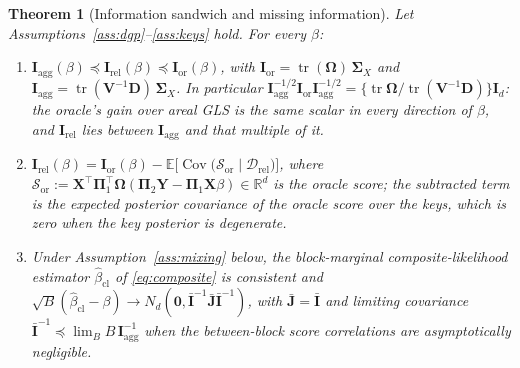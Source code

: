 \documentclass[11pt]{article}
\newtheorem{theorem}{Theorem}
\theoremstyle{definition}
\newcommand{\bX}{\mathbf{X}}
\newcommand{\bY}{\mathbf{Y}}
\newcommand{\bV}{\mathbf{V}}
\newcommand{\bD}{\mathbf{D}}
\newcommand{\bI}{\mathbf{I}}
\newcommand{\bzero}{\mathbf{0}}
\newcommand{\bSig}{\boldsymbol{\Sigma}}
\newcommand{\bOm}{\boldsymbol{\Omega}}
\newcommand{\bPi}{\boldsymbol{\Pi}}
\newcommand{\E}{\mathbb{E}}
\newcommand{\Cov}{\operatorname{Cov}}
\newcommand{\tr}{\operatorname{tr}}
\newcommand{\calD}{\mathcal{D}}
\newcommand{\rel}{\mathrm{rel}}
\newcommand{\agg}{\mathrm{agg}}
\newcommand{\orc}{\mathrm{or}}
\begin{document}
\begin{theorem}[Information sandwich and missing information]\label{thm:eff}
Let Assumptions~\ref{ass:dgp}--\ref{ass:keys} hold. For every $\beta$:
\begin{enumerate}
\item[(i)] $\mathbf I_\agg(\beta)\preceq\mathbf I_\rel(\beta)\preceq\mathbf I_\orc(\beta)$, with $\mathbf I_\orc=\tr(\bOm)\,\bSig_X$ and $\mathbf I_\agg=\tr(\bV^{-1}\bD)\,\bSig_X$. In particular $\mathbf I_\agg^{-1/2}\mathbf I_\orc\mathbf I_\agg^{-1/2}=\{\tr\bOm/\tr(\bV^{-1}\bD)\}\bI_d$: the oracle's gain over areal GLS is the same scalar in every direction of $\beta$, and $\mathbf I_\rel$ lies between $\mathbf I_\agg$ and that multiple of it.
\item[(ii)] $\mathbf I_\rel(\beta)=\mathbf I_\orc(\beta)-\E\big[\Cov\big(\bm{\mathcal S}_\orc\mid\calD_\rel\big)\big]$, where $\bm{\mathcal S}_\orc:=\bX^\top\bPi_1^\top\bOm(\bPi_2\bY-\bPi_1\bX\beta)\in\mathbb R^d$ is the oracle score; the subtracted term is the expected posterior covariance of the oracle score over the keys, which is zero when the key posterior is degenerate.
\item[(iii)] Under Assumption~\ref{ass:mixing} below, the block-marginal composite-likelihood estimator $\hat\beta_{\mathrm{cl}}$ of \eqref{eq:composite} is consistent and $\sqrt B(\hat\beta_{\mathrm{cl}}-\beta)\to N_d(\bzero,\bar{\mathbf I}^{-1}\bar{\mathbf J}\bar{\mathbf I}^{-1})$, with $\bar{\mathbf J}=\bar{\mathbf I}$ and limiting covariance $\bar{\mathbf I}^{-1}\preceq\lim_BB\,\mathbf I_\agg^{-1}$ when the between-block score correlations are asymptotically negligible.
\end{enumerate}
\end{theorem}
\end{document}
